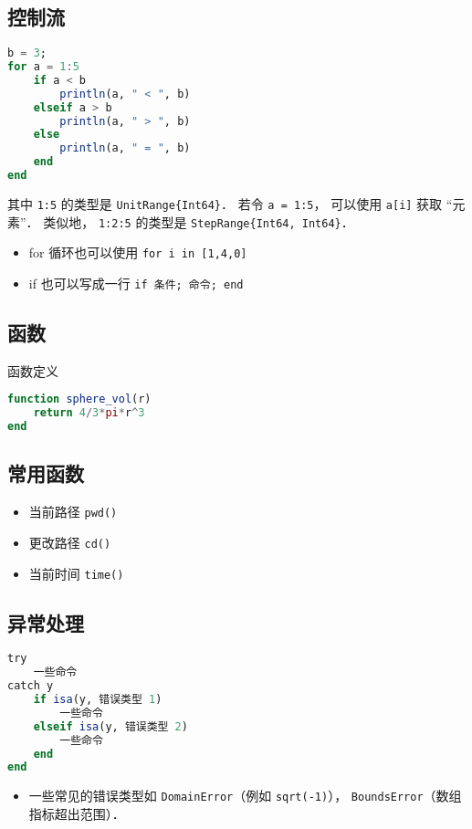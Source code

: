 \subsection{控制流}
\begin{lstlisting}[language=Julia]
b = 3;
for a = 1:5
    if a < b
        println(a, " < ", b)
    elseif a > b
        println(a, " > ", b)
    else
        println(a, " = ", b)
    end
end
\end{lstlisting}
其中 \verb|1:5| 的类型是 \verb|UnitRange{Int64}|． 若令 \verb|a = 1:5|， 可以使用 \verb|a[i]| 获取 “元素”． 类似地， \verb|1:2:5| 的类型是 \verb|StepRange{Int64, Int64}|．

\begin{itemize}
\item for 循环也可以使用 \verb|for i in [1,4,0]|
\item if 也可以写成一行 \verb|if 条件; 命令; end|
\end{itemize}

\subsection{函数}
函数定义
\begin{lstlisting}[language=julia]
function sphere_vol(r)
    return 4/3*pi*r^3
end
\end{lstlisting}

\subsection{常用函数}
\begin{itemize}
\item 当前路径 \verb|pwd()|
\item 更改路径 \verb|cd()|
\item 当前时间 \verb|time()|
\end{itemize}

\subsection{异常处理}
\begin{lstlisting}[language=julia]
try
    一些命令
catch y
    if isa(y, 错误类型 1)
        一些命令
    elseif isa(y, 错误类型 2)
        一些命令
    end
end
\end{lstlisting}
\begin{itemize}
\item 一些常见的错误类型如 \verb|DomainError|（例如 \verb|sqrt(-1)|）， \verb|BoundsError|（数组指标超出范围）．
\end{itemize}



